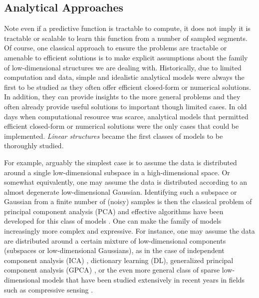 \documentclass[\toplevelprefix/book-main.tex]{subfiles}
\begin{document}
\subsection{Analytical Approaches}
\label{sec:analytical}
Note even if a predictive function is tractable to compute, it does not imply it is tractable or scalable to learn this function from a number of sampled segments. Of course, one classical approach to ensure the problems are tractable or amenable to efficient solutions is to make explicit assumptions about the family of low-dimensional structures we are dealing with. Historically, due to limited computation and data, simple and idealistic analytical models were always the first to be studied as they often offer efficient closed-form or numerical solutions. In addition, they can provide insights to the more general problems and they often already provide useful solutions to important though limited cases. In old days when computational resource was scarce, analytical models that permitted efficient closed-form or numerical solutions were the only cases that could be implemented. {\em Linear structures} became the first classes of models to be thoroughly studied.

For example, arguably the simplest case is to assume the data is distributed around a single low-dimensional subspace in a high-dimensional space. Or somewhat equivalently, one may assume the data is distributed according to an almost degenerate low-dimensional Gaussian. Identifying such a subspace or Gaussian from a finite number of (noisy) samples is then the classical problem of principal component analysis (PCA) and  effective algorithms have been developed for this class of models \cite{JolliffeI2002}. One can make the family of models increasingly more complex and expressive. For instance, one may assume the data are distributed around a certain mixture of low-dimensional components (subspaces or low-dimensional Gaussians), as in the case of independent component analysis (ICA) \cite{Ans-1985}, dictionary learning (DL), generalized principal component analysis (GPCA) \cite{Vidal-GPCA}, or the even more general class of sparse low-dimensional models that have been studied extensively in recent years in fields such as compressive sensing \cite{Wright-Ma-2022}. 
\end{document}
